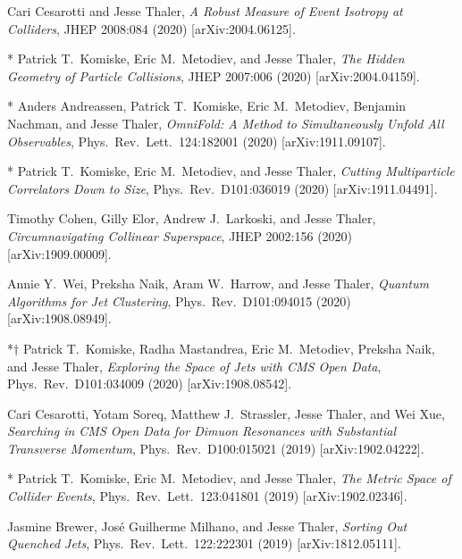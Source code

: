 \begin{list}{[]\addtocounter{jessecount}{-1}}{\leftmargin=3em \itemsep=4pt}
\item
 Cari Cesarotti and Jesse Thaler,
\emph{A Robust Measure of Event Isotropy at Colliders},
JHEP 2008:084 (2020)
[arXiv:2004.06125].

\item
* Patrick T.\ Komiske, Eric M.\ Metodiev, and Jesse Thaler,
\emph{The Hidden Geometry of Particle Collisions},
JHEP 2007:006 (2020)
[arXiv:2004.04159].

\item
* Anders Andreassen, Patrick T.\ Komiske, Eric M.\ Metodiev, Benjamin Nachman, and Jesse Thaler,
\emph{OmniFold: A Method to Simultaneously Unfold All Observables},
Phys.\ Rev.\ Lett.\ 124:182001 (2020)
[arXiv:1911.09107].

\item
* Patrick T.\ Komiske, Eric M.\ Metodiev, and Jesse Thaler,
\emph{Cutting Multiparticle Correlators Down to Size},
Phys.\ Rev.\ D101:036019 (2020)
[arXiv:1911.04491].

\item
 Timothy Cohen, Gilly Elor, Andrew J.\ Larkoski, and Jesse Thaler,
\emph{Circumnavigating Collinear Superspace},
JHEP 2002:156 (2020)
[arXiv:1909.00009].

\item
 Annie Y.\ Wei, Preksha Naik, Aram W.\ Harrow, and Jesse Thaler,
\emph{Quantum Algorithms for Jet Clustering},
Phys.\ Rev.\ D101:094015 (2020)
[arXiv:1908.08949].

\item
*$\dagger$ Patrick T.\ Komiske, Radha Mastandrea, Eric M.\ Metodiev, Preksha Naik, and Jesse Thaler,
\emph{Exploring the Space of Jets with CMS Open Data},
Phys.\ Rev.\ D101:034009 (2020)
[arXiv:1908.08542].

\item
 Cari Cesarotti, Yotam Soreq, Matthew J.\ Strassler, Jesse Thaler, and Wei Xue,
\emph{Searching in CMS Open Data for Dimuon Resonances with Substantial Transverse Momentum},
Phys.\ Rev.\ D100:015021 (2019)
[arXiv:1902.04222].

\item
* Patrick T.\ Komiske, Eric M.\ Metodiev, and Jesse Thaler,
\emph{The Metric Space of Collider Events},
Phys.\ Rev.\ Lett.\ 123:041801 (2019)
[arXiv:1902.02346].

\item
 Jasmine Brewer, José Guilherme Milhano, and Jesse Thaler,
\emph{Sorting Out Quenched Jets},
Phys.\ Rev.\ Lett.\ 122:222301 (2019)
[arXiv:1812.05111].


\end{list}
